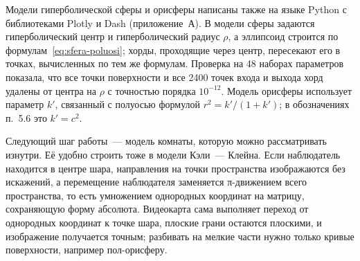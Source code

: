 Модели гиперболической сферы и орисферы написаны также на языке Python с библиотеками Plotly и Dash (приложение~А). В модели сферы задаются гиперболический центр и гиперболический радиус $\rho$, а эллипсоид строится по формулам~\eqref{eq:sfera-poluosi}; хорды, проходящие через центр, пересекают его в точках, вычисленных по тем же формулам. Проверка на 48 наборах параметров показала, что все точки поверхности и все 2400 точек входа и выхода хорд удалены от центра на $\rho$ с точностью порядка $10^{-12}$. Модель орисферы использует параметр $k'$, связанный с полуосью формулой $r^2=k'/(1+k')$; в обозначениях п.~5.6 это $k'=c^2$.

Следующий шаг работы~--- модель комнаты, которую можно рассматривать изнутри. Её удобно строить тоже в модели Кэли~--- Клейна. Если наблюдатель находится в центре шара, направления на точки пространства изображаются без искажений, а перемещение наблюдателя заменяется π-движением всего пространства, то есть умножением однородных координат на матрицу, сохраняющую форму абсолюта. Видеокарта сама выполняет переход от однородных координат к точке шара, плоские грани остаются плоскими, и изображение получается точным; разбивать на мелкие части нужно только кривые поверхности, например пол-орисферу.
